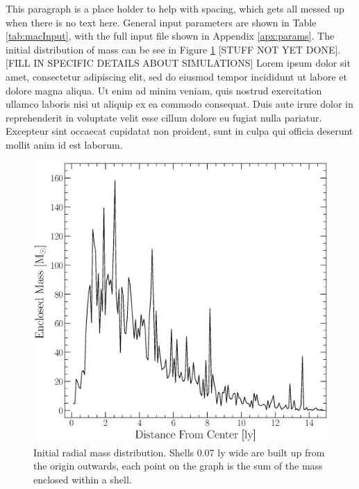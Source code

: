 \documentclass[twocolumn]{aastex62}
\newcommand{\colorred}[1]{\color{red}#1\color{black}\hspace{0.5mm}}
\begin{document}
This paragraph is a place holder to help with spacing, which gets all messed up when there is no text here. General input parameters are shown in Table \ref{tab:macInput}, with the full input file shown in Appendix \ref{apx:params}. The initial distribution of mass can be see in Figure \ref{fig:init_distribution} [STUFF NOT YET DONE]. [FILL IN SPECIFIC DETAILS ABOUT SIMULATIONS] \colorred{Lorem ipsum dolor sit amet, consectetur adipiscing elit, sed do eiusmod tempor incididunt ut labore et dolore magna aliqua. Ut enim ad minim veniam, quis nostrud exercitation ullamco laboris nisi ut aliquip ex ea commodo consequat. Duis aute irure dolor in reprehenderit in voluptate velit esse cillum dolore eu fugiat nulla pariatur. Excepteur sint occaecat cupidatat non proident, sunt in culpa qui officia deserunt mollit anim id est laborum.}

\begin{figure}
    \centering
    \includegraphics[scale=0.32]{Figures/EnclosedMass.eps}
    \caption{Initial radial mass distribution. Shells 0.07 ly wide are built up from the origin outwards, each point on the graph is the sum of the mass enclosed within a shell.}
    \label{fig:init_distribution}
\end{figure}
\end{document}
